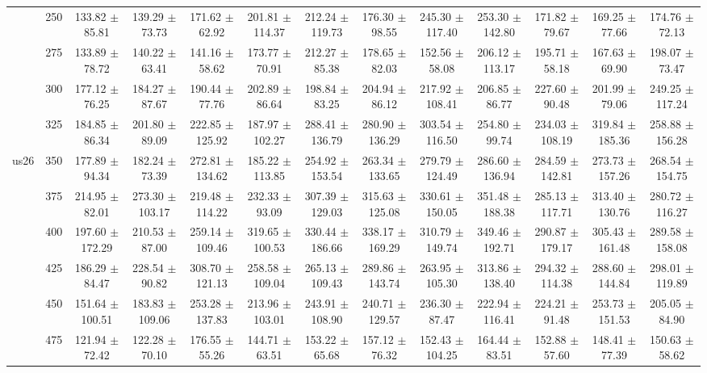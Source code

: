 \begin{table}[h]
{\begin{tabular}{
        ccccccccccccc}
 & 250& 133.82 $\pm$ 85.81& 139.29 $\pm$ 73.73& 171.62 $\pm$ 62.92& 201.81 $\pm$ 114.37& 212.24 $\pm$ 119.73& 176.30 $\pm$ 98.55& 245.30 $\pm$ 117.40& 253.30 $\pm$ 142.80& 171.82 $\pm$ 79.67& 169.25 $\pm$ 77.66& 174.76 $\pm$ 72.13 \\ 
 & 275& 133.89 $\pm$ 78.72& 140.22 $\pm$ 63.41& 141.16 $\pm$ 58.62& 173.77 $\pm$ 70.91& 212.27 $\pm$ 85.38& 178.65 $\pm$ 82.03& 152.56 $\pm$ 58.08& 206.12 $\pm$ 113.17& 195.71 $\pm$ 58.18& 167.63 $\pm$ 69.90& 198.07 $\pm$ 73.47 \\ 
 & 300& 177.12 $\pm$ 76.25& 184.27 $\pm$ 87.67& 190.44 $\pm$ 77.76& 202.89 $\pm$ 86.64& 198.84 $\pm$ 83.25& 204.94 $\pm$ 86.12& 217.92 $\pm$ 108.41& 206.85 $\pm$ 86.77& 227.60 $\pm$ 90.48& 201.99 $\pm$ 79.06& 249.25 $\pm$ 117.24 \\ 
 & 325& 184.85 $\pm$ 86.34& 201.80 $\pm$ 89.09& 222.85 $\pm$ 125.92& 187.97 $\pm$ 102.27& 288.41 $\pm$ 136.79& 280.90 $\pm$ 136.29& 303.54 $\pm$ 116.50& 254.80 $\pm$ 99.74& 234.03 $\pm$ 108.19& 319.84 $\pm$ 185.36& 258.88 $\pm$ 156.28 \\ 
\multirow{4}{*}{us26}& 350& 177.89 $\pm$ 94.34& 182.24 $\pm$ 73.39& 272.81 $\pm$ 134.62& 185.22 $\pm$ 113.85& 254.92 $\pm$ 153.54& 263.34 $\pm$ 133.65& 279.79 $\pm$ 124.49& 286.60 $\pm$ 136.94& 284.59 $\pm$ 142.81& 273.73 $\pm$ 157.26& 268.54 $\pm$ 154.75 \\ 
 & 375& 214.95 $\pm$ 82.01& 273.30 $\pm$ 103.17& 219.48 $\pm$ 114.22& 232.33 $\pm$ 93.09& 307.39 $\pm$ 129.03& 315.63 $\pm$ 125.08& 330.61 $\pm$ 150.05& 351.48 $\pm$ 188.38& 285.13 $\pm$ 117.71& 313.40 $\pm$ 130.76& 280.72 $\pm$ 116.27 \\ 
 & 400& 197.60 $\pm$ 172.29& 210.53 $\pm$ 87.00& 259.14 $\pm$ 109.46& 319.65 $\pm$ 100.53& 330.44 $\pm$ 186.66& 338.17 $\pm$ 169.29& 310.79 $\pm$ 149.74& 349.46 $\pm$ 192.71& 290.87 $\pm$ 179.17& 305.43 $\pm$ 161.48& 289.58 $\pm$ 158.08 \\ 
 & 425& 186.29 $\pm$ 84.47& 228.54 $\pm$ 90.82& 308.70 $\pm$ 121.13& 258.58 $\pm$ 109.04& 265.13 $\pm$ 109.43& 289.86 $\pm$ 143.74& 263.95 $\pm$ 105.30& 313.86 $\pm$ 138.40& 294.32 $\pm$ 114.38& 288.60 $\pm$ 144.84& 298.01 $\pm$ 119.89 \\ 
 & 450& 151.64 $\pm$ 100.51& 183.83 $\pm$ 109.06& 253.28 $\pm$ 137.83& 213.96 $\pm$ 103.01& 243.91 $\pm$ 108.90& 240.71 $\pm$ 129.57& 236.30 $\pm$ 87.47& 222.94 $\pm$ 116.41& 224.21 $\pm$ 91.48& 253.73 $\pm$ 151.53& 205.05 $\pm$ 84.90 \\ 
 & 475& 121.94 $\pm$ 72.42& 122.28 $\pm$ 70.10& 176.55 $\pm$ 55.26& 144.71 $\pm$ 63.51& 153.22 $\pm$ 65.68& 157.12 $\pm$ 76.32& 152.43 $\pm$ 104.25& 164.44 $\pm$ 83.51& 152.88 $\pm$ 57.60& 148.41 $\pm$ 77.39& 150.63 $\pm$ 58.62 \\ 

\end{tabular}}
\end{table}
